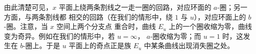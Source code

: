 
由此清楚可见，$x$ 平面上绕两条割线之一走一圈的回路，对应环面的 $a$-圈；另一方面，与两条割线都
相交的回路（在我们的情形中，绕 $1$ 与 $u$），对应环面上的 $b$-圈。注意，当 $x$ 空间上两个分支点
重合时，曲线 $E_u$ 上的一个圈收缩为零，曲线变为奇异。例如在我们的情形中，若 $u=\infty$，
$a$-圈收缩为零；而 $u=1$ 时，这发生在 $b$-圈上。于是 $u$ 平面上的奇点正是族 $E_u$ 中某条曲线出现消失圈之处。


